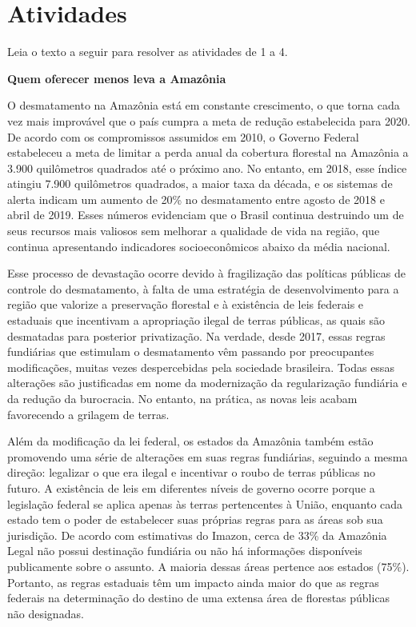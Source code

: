 \section*{Atividades}

Leia o texto a seguir para resolver as atividades de 1 a 4.

\begin{myquote}
\centering\textbf{Quem oferecer menos leva a Amazônia}

O desmatamento na Amazônia está em constante crescimento, o que torna
cada vez mais improvável que o país cumpra a meta de redução
estabelecida para 2020. De acordo com os compromissos assumidos em 2010,
o Governo Federal estabeleceu a meta de limitar a perda anual da
cobertura florestal na Amazônia a 3.900 quilômetros quadrados até o
próximo ano. No entanto, em 2018, esse índice atingiu 7.900 quilômetros
quadrados, a maior taxa da década, e os sistemas de alerta indicam um
aumento de 20\% no desmatamento entre agosto de 2018 e abril de 2019.
Esses números evidenciam que o Brasil continua destruindo um de seus
recursos mais valiosos sem melhorar a qualidade de vida na região, que
continua apresentando indicadores socioeconômicos abaixo da média
nacional.

Esse processo de devastação ocorre devido à fragilização das políticas
públicas de controle do desmatamento, à falta de uma estratégia de
desenvolvimento para a região que valorize a preservação florestal e à
existência de leis federais e estaduais que incentivam a apropriação
ilegal de terras públicas, as quais são desmatadas para posterior
privatização. Na verdade, desde 2017, essas regras fundiárias que
estimulam o desmatamento vêm passando por preocupantes modificações,
muitas vezes despercebidas pela sociedade brasileira. Todas essas
alterações são justificadas em nome da modernização da regularização
fundiária e da redução da burocracia. No entanto, na prática, as novas
leis acabam favorecendo a grilagem de terras.

Além da modificação da lei federal, os estados da Amazônia também estão
promovendo uma série de alterações em suas regras fundiárias, seguindo a
mesma direção: legalizar o que era ilegal e incentivar o roubo de terras
públicas no futuro. A existência de leis em diferentes níveis de governo
ocorre porque a legislação federal se aplica apenas às terras
pertencentes à União, enquanto cada estado tem o poder de estabelecer
suas próprias regras para as áreas sob sua jurisdição. De acordo com
estimativas do Imazon, cerca de 33\% da Amazônia Legal não possui
destinação fundiária ou não há informações disponíveis publicamente
sobre o assunto. A maioria dessas áreas pertence aos estados (75\%).
Portanto, as regras estaduais têm um impacto ainda maior do que as
regras federais na determinação do destino de uma extensa área de
florestas públicas não designadas.

\end{myquote}


